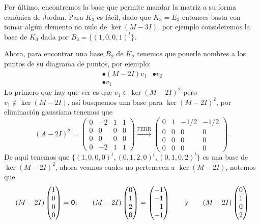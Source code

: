 \begin{example}
  Por último, encontremos la base que permite mandar la matriz a su forma canónica de Jordan. Para $K_3$ es fácil, dado que $K_3 = E_3$ entonces basta con tomar algún elemento no nulo de $\ker(M-3I)$, por ejemplo consideremos la base de $K_3$ dada por $B_3 = \{(1,0,0,1)^t\}$.

  Ahora, para encontrar una base $B_2$ de $K_2$ tenemos que ponerle nombres a los puntos de su diagrama de puntos, por ejemplo:
  \[
    \begin{array}{ll}
      \bullet (M-2I)v_1 & \bullet v_2\\
      \bullet v_1
    \end{array}
  \]
  Lo primero que hay que ver es que $v_1 \in \ker(M-2I)^2$ pero $v_1 \notin \ker(M-2I)$, así busquemos una base para $\ker(M-2I)^2$, por eliminación gaussiana tenemos que
    \[
      (A-2I)^2 = \begin{pmatrix}0&-2&1&1\\ 0&0&0&0\\ 0&0&0&0\\ 0&-2&1&1\end{pmatrix}
        \xrightarrow{\text{FERR}}
        \begin{pmatrix}0&1&-1/2&-1/2\\ 0&0&0&0\\ 0&0&0&0\\ 0&0&0&0\end{pmatrix}.
    \]
  De aquí tenemos que $\{ (1, 0, 0, 0)^t, (0,1,2,0)^t, (0,1,0,2)^t \}$ es una base de $\ker(M-2I)^2$, ahora veamos cuales no pertenecen a $\ker(M-2I)$, notemos que
  \[
    (M-2I) \begin{pmatrix}
      1 \\ 0 \\ 0 \\ 0
    \end{pmatrix} = \mathbf{0},
        \qquad
    (M-2I) \begin{pmatrix}
      0 \\ 1 \\ 2 \\ 0
    \end{pmatrix} = \begin{pmatrix}
      -1 \\ -1 \\ -1 \\ -1
    \end{pmatrix} 
      \qquad\text{y}\qquad
      (M-2I) \begin{pmatrix}
        0 \\ 1 \\ 0 \\ 2

\end{pmatrix}\]
\end{example}
